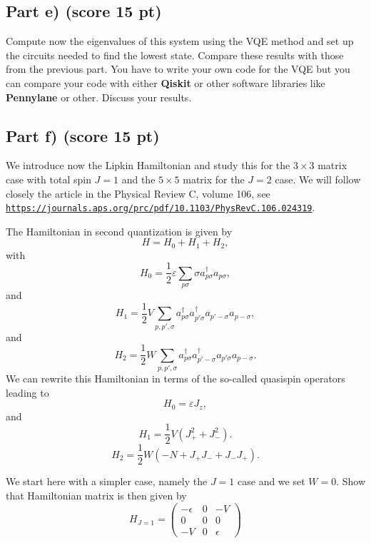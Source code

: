 \documentclass[%
oneside,                 %
final,                   %
10pt]{article}
\begin{document}
\subsection*{Part e) (score 15 pt)}

Compute now the eigenvalues of this system using the VQE method and
set up the circuits needed to find the lowest state. Compare these
results with those from the previous part.
You have to write your own code for the VQE but you can compare your code
with either \textbf{Qiskit} or other software libraries like \textbf{Pennylane} or other.
Discuss your results.

\subsection*{Part f) (score 15 pt)}

We introduce now the Lipkin Hamiltonian and study this for the
$3\times 3$ matrix case with total spin $J=1$ and the $5\times 5$
matrix for the $J=2$ case.
We will follow closely the article in the Physical Review C, volume 106, see \href{{https://journals.aps.org/prc/pdf/10.1103/PhysRevC.106.024319}}{\nolinkurl{https://journals.aps.org/prc/pdf/10.1103/PhysRevC.106.024319}}.

The Hamiltonian in second quantization is given by
\[
H = H_0 + H_1 +H_2,
\]
with 
\[
H_0 = \frac{1}{2} \varepsilon \sum_{p\sigma}\sigma a_{p\sigma}^{\dagger}a_{p\sigma},
\]
and
\[
H_1 = \frac{1}{2} V \sum_{p,p',\sigma} a_{p\sigma}^\dagger a_{p'\sigma}^\dagger a_{p'-\sigma} a_{p-\sigma},
\]
and
\[
H_{2} = \frac{1}{2} W \sum_{p,p',\sigma}a_{p\sigma}^\dagger a_{p'-\sigma}^\dagger a_{p'\sigma}a_{p-\sigma}.
\]
We can rewrite this Hamiltonian in terms of the so-called quasispin operators leading to
\begin{equation}
H_0 = \varepsilon J_z,
\end{equation}
and
\begin{equation}
H_1 = \frac{1}{2} V \left( J_+^2 + J_-^2 \right).
\end{equation}
\begin{equation}
H_2 = \frac{1}{2} W \left( -N + J_+ J_- + J_- J_+ \right).
\end{equation}

We start here with a simpler case, namely the $J=1$ case and we set $W=0$. Show that Hamiltonian matrix is then given by
\begin{equation}
H_{J = 1} =
\begin{pmatrix}-\epsilon & 0 & -V\\
 0&0&0\\
 -V&0&\epsilon
\end{pmatrix}
\end{equation}
\end{document}
